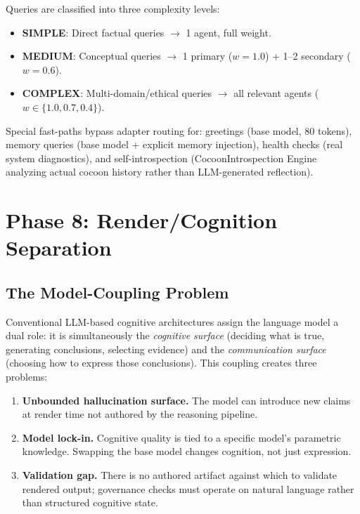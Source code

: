 \documentclass[11pt,a4paper]{article}
\begin{document}
Queries are classified into three complexity levels:
\begin{itemize}[nosep]
  \item \textbf{SIMPLE}: Direct factual queries $\to$ 1 agent, full weight.
  \item \textbf{MEDIUM}: Conceptual queries $\to$ 1 primary ($w=1.0$) +
    1--2 secondary ($w=0.6$).
  \item \textbf{COMPLEX}: Multi-domain/ethical queries $\to$ all relevant
    agents ($w \in \{1.0, 0.7, 0.4\}$).
\end{itemize}

Special fast-paths bypass adapter routing for: greetings (base model, 80
tokens), memory queries (base model + explicit memory injection), health
checks (real system diagnostics), and self-introspection (CocoonIntrospection
Engine analyzing actual cocoon history rather than LLM-generated reflection).

\section{Phase 8: Render/Cognition Separation}
\label{sec:phase8}

\subsection{The Model-Coupling Problem}

Conventional LLM-based cognitive architectures assign the language model a
dual role: it is simultaneously the \emph{cognitive surface} (deciding what is
true, generating conclusions, selecting evidence) and the \emph{communication
surface} (choosing how to express those conclusions). This coupling creates
three problems:

\begin{enumerate}[nosep]
  \item \textbf{Unbounded hallucination surface.} The model can introduce new
    claims at render time not authored by the reasoning pipeline.
  \item \textbf{Model lock-in.} Cognitive quality is tied to a specific
    model's parametric knowledge. Swapping the base model changes cognition,
    not just expression.
  \item \textbf{Validation gap.} There is no authored artifact against which
    to validate rendered output; governance checks must operate on natural
    language rather than structured cognitive state.
\end{enumerate}
\end{document}
